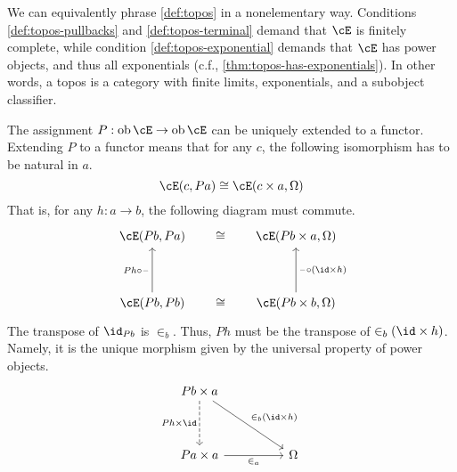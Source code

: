 \documentclass[article,10pt,oneside]{memoir}
\begin{document}
\begin{rmk}
  We can equivalently phrase \cref{def:topos} in a nonelementary way.
  Conditions \ref{def:topos-pullbacks} and \ref{def:topos-terminal} demand that $\cE$ is finitely complete, while condition \ref{def:topos-exponential} demands that $\cE$ has power objects, and thus all exponentials (c.f., \cref{thm:topos-has-exponentials}).
  In other words, a topos is a category with finite limits, exponentials, and a subobject classifier.
\end{rmk}

\begin{rmk}
  The assignment $P : \ob\cE \to \ob\cE$ can be uniquely extended to a functor.
  Extending $P$ to a functor means that for any $c$, the following isomorphism has to be natural in $a$.
  \[
    \cE(c, Pa) \iso \cE(c \times a, \Omega)
  \]
  That is, for any $h : a \to b$, the following diagram must commute.
  \[\begin{tikzcd}
      {\cE(Pb,Pa)} && {\cE(Pb \times a, \Omega)} \\
      \\
      {\cE(Pb, Pb)} && {\cE(Pb \times b, \Omega)}
      \arrow["\iso"{marking, allow upside down}, draw=none, from=1-1, to=1-3]
      \arrow["\iso"{marking, allow upside down}, draw=none, from=3-1, to=3-3]
      \arrow["{\blank \circ (\id \times h)}"', from=3-3, to=1-3]
      \arrow["{Ph \circ \blank}", from=3-1, to=1-1]
    \end{tikzcd}\]
  The transpose of $\id_{Pb}$ is $\in_{b}$.
  Thus, $Ph$ must be the transpose of $\in_{b}(\id \times h)$.
  Namely, it is the unique morphism given by the universal property of power objects.
  \[\begin{tikzcd}
      {Pb \times a} \\
      \\
      {Pa \times a} && \Omega
      \arrow["{\in_{a}}"', from=3-1, to=3-3]
      \arrow["{\in_{b}(\id \times h)}", from=1-1, to=3-3]
      \arrow["{Ph \times \id}"', dashed, from=1-1, to=3-1]
    \end{tikzcd}\]
\end{rmk}
\end{document}
